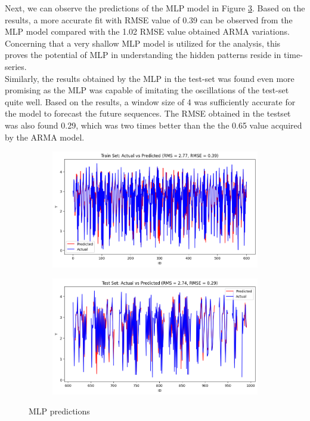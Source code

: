 \documentclass{article}
\begin{document}
\newpage
Next, we can observe the predictions of the MLP model in Figure \ref{fig:mlp}. Based on the results, a more accurate fit with RMSE value of 0.39 can be observed from the MLP model compared with the 1.02 RMSE value obtained ARMA variations. Concerning that a very shallow MLP model is utilized for the analysis, this proves the potential of MLP in understanding the hidden patterns reside in time-series.\\ 
Similarly, the results obtained by the MLP in the test-set was found even more promising as the MLP was capable of imitating the oscillations of the test-set quite well. Based on the results, a window size of 4 was sufficiently accurate for the model to forecast the future sequences. The RMSE obtained in the testset was also found 0.29, which was two times better than the the 0.65 value acquired by the ARMA model.
\begin{figure}[h!]
    \centering
    \begin{subfigure}{0.675\linewidth}
        \includegraphics[width=\linewidth]{Fig05-1.png}
        \label{fig:05A}
    \end{subfigure}
    \begin{subfigure}{0.675\linewidth}
        \includegraphics[width=\linewidth]{Fig05-2.png}
        \label{fig:05B}
    \end{subfigure}
    \caption{MLP predictions}
    \label{fig:mlp}
\end{figure}
\end{document}
